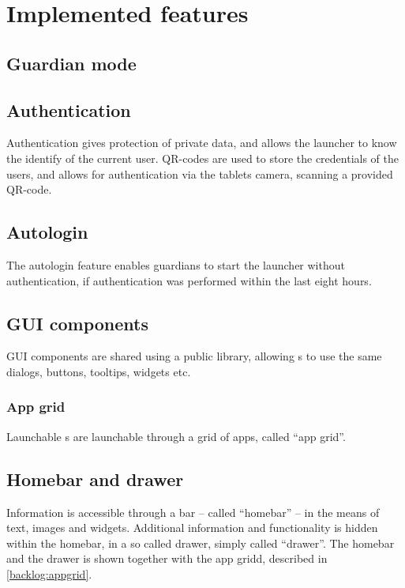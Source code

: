 \section{Implemented features}
\label{backlog_implemented}

\subsection{Guardian mode}
\label{backlog:guardian_mode}
%
\subsection{Authentication}
\label{backlog:authentication}
Authentication gives protection of private data, and allows the launcher to know the identify of the current user.
QR-codes are used to store the credentials of the users, and allows for authentication via the tablets camera, scanning a provided QR-code.

\subsection{Autologin}
\label{backlog:autologin}
The autologin feature enables guardians to start the launcher without authentication, if authentication was performed within the last eight hours.

%
\subsection{GUI components}
\label{backlog:GUI_components}
GUI components are shared using a public library, allowing \girafapp[]s to use the same dialogs, buttons, tooltips, widgets etc.

\subsubsection{App grid}
\label{backlog:appgrid}
Launchable \girafapp[]s are launchable through a grid of apps, called ``app grid''.

%
\subsection{Homebar and drawer}
\label{backlog:homebar_drawer}
Information is accessible through a bar -- called ``homebar'' -- in the means of text, images and widgets.
Additional information and functionality is hidden within the homebar, in a so called drawer, simply called ``drawer''. The homebar and the drawer is shown together with the app gridd, described in \autoref{backlog:appgrid}.

